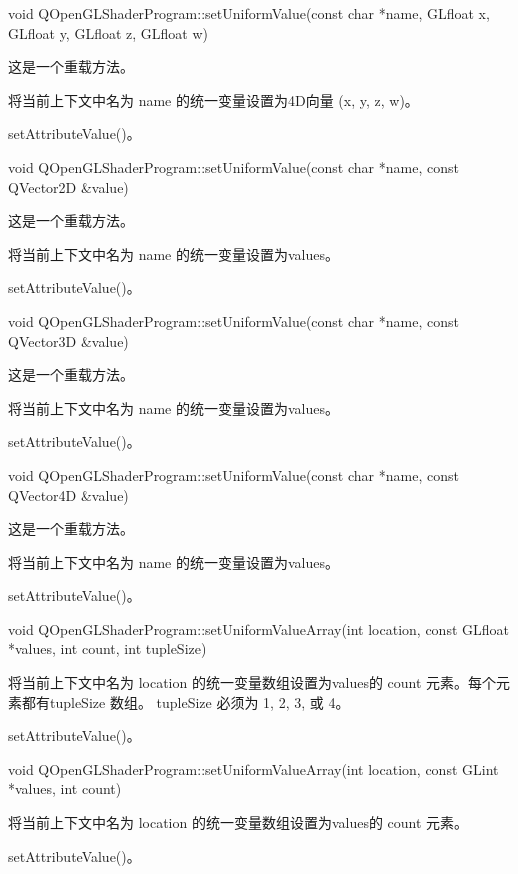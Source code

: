 void QOpenGLShaderProgram::setUniformValue(const char *name, GLfloat x, GLfloat y, GLfloat z, GLfloat w)

这是一个重载方法。

将当前上下文中名为 name 的统一变量设置为4D向量 (x, y, z, w)。

\begin{seeAlso}
setAttributeValue()。
\end{seeAlso}

void QOpenGLShaderProgram::setUniformValue(const char *name, const QVector2D \&value)

这是一个重载方法。

将当前上下文中名为 name 的统一变量设置为values。


\begin{seeAlso}
setAttributeValue()。
\end{seeAlso}

void QOpenGLShaderProgram::setUniformValue(const char *name, const QVector3D \&value)

这是一个重载方法。

将当前上下文中名为 name 的统一变量设置为values。

\begin{seeAlso}
setAttributeValue()。
\end{seeAlso}

void QOpenGLShaderProgram::setUniformValue(const char *name, const QVector4D \&value)

这是一个重载方法。

将当前上下文中名为 name 的统一变量设置为values。

\begin{seeAlso}
setAttributeValue()。
\end{seeAlso}

void QOpenGLShaderProgram::setUniformValueArray(int location, const GLfloat *values, int count, int tupleSize)

将当前上下文中名为 location 的统一变量数组设置为values的 count 元素。每个元素都有tupleSize 数组。 tupleSize 必须为 1, 2, 3, 或 4。

\begin{seeAlso}
setAttributeValue()。
\end{seeAlso}

void QOpenGLShaderProgram::setUniformValueArray(int location, const GLint *values, int count)

将当前上下文中名为 location 的统一变量数组设置为values的 count 元素。

\begin{seeAlso}
setAttributeValue()。
\end{seeAlso}


